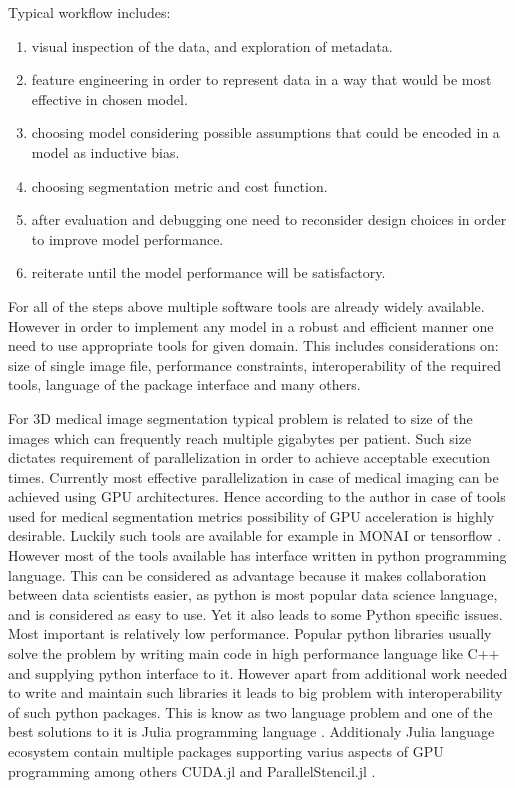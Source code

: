 \documentclass{juliacon}
\begin{document}
Typical workflow includes:
\begin{enumerate}
  \item visual inspection of  the data, and exploration of metadata.
  \item feature engineering in order to represent data in a way that would be most effective in chosen model.
  \item choosing model considering possible assumptions that could be encoded in a model as inductive bias.
  \item choosing segmentation metric and cost function.
  \item after evaluation and debugging one need to reconsider design choices in order to improve model performance.
  \item reiterate until the model performance will be satisfactory.
\end{enumerate}

For all of the steps above multiple software tools are already widely available.
However in order to implement any model in a robust and efficient manner one need to use appropriate tools for given domain. This includes considerations on: size of single image file, performance constraints, interoperability of the required tools, language of the package interface and many others.

For 3D medical image segmentation typical problem is related to size of the images which can frequently reach multiple gigabytes per patient. Such size dictates requirement of parallelization in order to achieve acceptable execution times. Currently most effective parallelization in case of medical imaging can be achieved using GPU architectures.  Hence according to the author in case of tools used for medical segmentation metrics possibility of GPU acceleration is highly desirable. Luckily such tools are available for example in MONAI \cite{MONAI} or tensorflow \cite{tensorflow}. However most of the tools available has interface written in python programming language. This can be considered as advantage because it makes collaboration between data scientists easier, as python is most popular data science language, and is considered as easy to use. Yet it also leads to some Python specific issues. Most important is relatively low performance. Popular python libraries usually solve the problem by writing main code in high performance language like C++ and supplying python interface to it. However apart from additional work needed to write and maintain such libraries it leads to big problem with interoperability of such python packages. This is know as two language problem and one of the best solutions to it is Julia programming language \cite{Julia}. Additionaly Julia language ecosystem contain multiple packages supporting varius aspects of GPU programming among others CUDA.jl \cite{besard2019prototyping} and ParallelStencil.jl \cite{ParallelStencil}.
\end{document}
